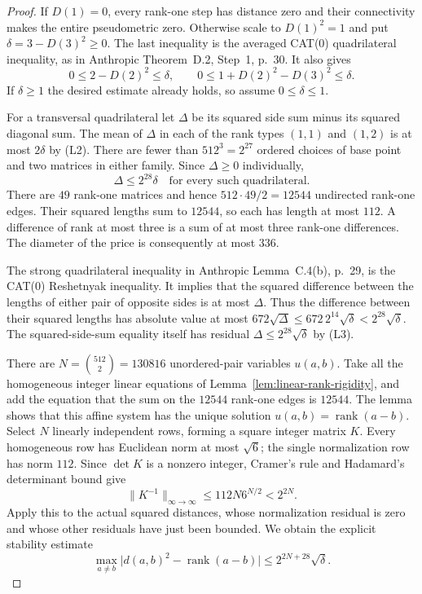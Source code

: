 \begin{proof}
If $D(1)=0$, every rank-one step has distance zero and their
connectivity makes the entire pseudometric zero.  Otherwise
scale to $D(1)^2=1$ and put $\delta=3-D(3)^2\ge0$.
The last inequality is the averaged CAT(0) quadrilateral
inequality, as in Anthropic Theorem~D.2, Step~1, p.~30.
It also gives
\[
 0\le2-D(2)^2\le\delta,\qquad
 0\le1+D(2)^2-D(3)^2\le\delta.
 \tag{L2}
\]
If $\delta\ge1$ the desired estimate already holds, so assume
$0\le\delta\le1$.

For a transversal quadrilateral let $\Delta$ be its squared
side sum minus its squared diagonal sum.  The mean of $\Delta$
in each of the rank types $(1,1)$ and $(1,2)$ is at most
$2\delta$ by (L2).  There are fewer than
$512^3=2^{27}$ ordered choices of base point and two matrices
in either family.  Since $\Delta\ge0$ individually,
\[
 \Delta\le2^{28}\delta
 \quad\text{for every such quadrilateral}.                 \tag{L3}
\]
There are $49$ rank-one matrices and hence $512\cdot49/2=12544$
undirected rank-one edges.  Their squared lengths sum to $12544$,
so each has length at most $112$.  A difference of rank at most
three is a sum of at most three rank-one differences.  The
diameter of the price is consequently at most $336$.

The strong quadrilateral inequality in Anthropic
Lemma~C.4(b), p.~29, is the CAT(0) Reshetnyak inequality.
It implies that the squared difference between the lengths of
either pair of opposite sides is at most $\Delta$.
Thus the difference between their squared lengths has absolute
value at most
$672\sqrt\Delta\le672\,2^{14}\sqrt\delta
 <2^{28}\sqrt\delta$.
The squared-side-sum equality itself has residual
$\Delta\le2^{28}\sqrt\delta$ by (L3).

There are
$N=\binom{512}{2}=130816$ unordered-pair variables $u(a,b)$.
Take all the homogeneous integer linear equations of
Lemma~\ref{lem:linear-rank-rigidity}, and add the equation
that the sum on the $12544$ rank-one edges is $12544$.
The lemma shows that this affine system has the unique solution
$u(a,b)=\operatorname{rank}(a-b)$.  Select $N$ linearly
independent rows, forming a square integer matrix $K$.
Every homogeneous row has Euclidean norm at most $\sqrt6$;
the single normalization row has norm $112$.
Since $\det K$ is a nonzero integer, Cramer's rule and
Hadamard's determinant bound give
\[
 \|K^{-1}\|_{\infty\to\infty}
 \le112N6^{N/2}<2^{2N}.
\]
Apply this to the actual squared distances, whose normalization
residual is zero and whose other residuals have just been
bounded.  We obtain the explicit stability estimate
\[
 \max_{a\ne b}
 \bigl|d(a,b)^2-\operatorname{rank}(a-b)\bigr|
 \le2^{2N+28}\sqrt\delta.                               \tag{L4}
\]


\end{proof}
